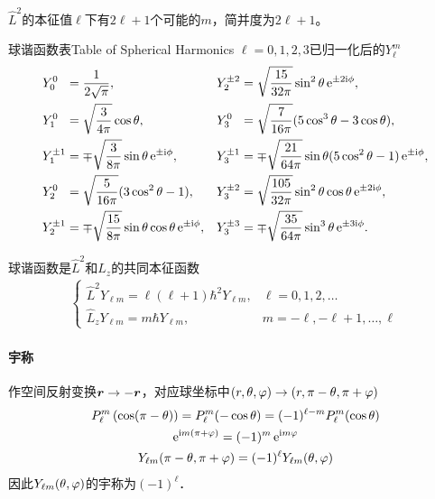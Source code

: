 $\hat L^2$的本征值$\ell$下有$2\ell+1$个可能的$m$，简并度为$2\ell+1$。
\begin{example}{球谐函数表}{Table of Spherical Harmonics}
	$\ell=0,1,2,3$已归一化后的$Y_\ell^m$
	\small{\begin{align*}
			Y_0^0~\;    & =\frac1{2\sqrt\pi},                                           & Y_2^{\pm 2} & =\sqrt{\frac{15}{32\pi}}\sin^2\theta\mathop{}\!\mathrm{e}^{\pm 2\mathrm{i}\phi},                 \\
			Y_1^0~\;    & =\sqrt{\frac3{4\pi}}\cos\theta,                               & Y_3^0~\;    & =\sqrt{\frac7{16\pi}}(5\cos^3\theta-3\cos\theta),                    \\
			Y_1^{\pm 1} & =\mp\sqrt{\frac3{8\pi}}\sin\theta\mathop{}\!\mathrm{e}^{\pm\mathrm{i}\phi},               & Y_3^{\pm 1} & =\mp\sqrt{\frac{21}{64\pi}}\sin\theta(5\cos^2\theta-1)\mathop{}\!\mathrm{e}^{\pm\mathrm{i}\phi}, \\
			Y_2^0~\;    & =\sqrt{\frac5{16\pi}}(3\cos^2\theta-1),                       & Y_3^{\pm 2} & =\sqrt{\frac{105}{32\pi}}\sin^2\theta\cos\theta\mathop{}\!\mathrm{e}^{\pm 2\mathrm{i}\phi},      \\
			Y_2^{\pm 1} & =\mp\sqrt{\frac{15}{8\pi}}\sin\theta\cos\theta\mathop{}\!\mathrm{e}^{\pm \mathrm{i}\phi}, & Y_3^{\pm 3} & =\mp\sqrt{\frac{35}{64\pi}}\sin^3\theta\mathop{}\!\mathrm{e}^{\pm 3\mathrm{i}\phi}.
		\end{align*}}
\end{example}
球谐函数是$\hat L^2$和$\hat L_z$的共同本征函数
\begin{align*}
	\begin{cases}
		\hat L^2Y_{\ell m}=\ell(\ell+1)\hbar^2Y_{\ell m}, & \ell=0,1,2,\ldots           \\
		\hat L_zY_{\ell m}=m\hbar Y_{\ell m},             & m=-\ell,-\ell+1,\ldots,\ell
	\end{cases}
\end{align*}
\paragraph*{宇称}作空间反射变换$\bm r\to-\bm r$，对应球坐标中$(r,\theta,\varphi)\to(r,\pi-\theta,\pi+\varphi)$
\begin{gather*}
	P_{\ell}^{m}\left(\cos (\pi-\theta)\right)=P_{\ell}^{m}(-\cos \theta)=(-1)^{\ell-m} P_{\ell}^{m}(\cos \theta) \\
	\mathop{}\!\mathrm{e}^{\mathrm{i} m(\pi+\varphi)}=(-1)^{m}\mathop{}\!\mathrm{e}^{\mathrm{i} m \varphi}                                                   \\
	Y_{\ell m}(\pi-\theta, \pi+\varphi)=(-1)^{\ell} Y_{\ell m}(\theta, \varphi)
\end{gather*}
因此$Y_{\ell m}(\theta,\varphi)$的宇称为$(-1)^\ell$．
